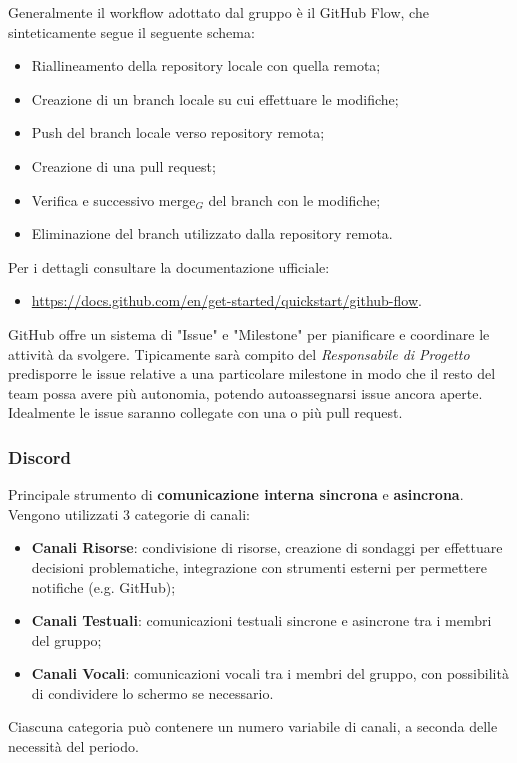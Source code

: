 Generalmente il workflow adottato dal gruppo è il GitHub Flow, che sinteticamente segue il seguente schema:
\begin{itemize}
  \item Riallineamento della repository locale con quella remota;
  \item Creazione di un branch locale su cui effettuare le modifiche;
  \item Push del branch locale verso repository remota;
  \item Creazione di una pull request;
  \item Verifica e successivo merge$_G$ del branch con le modifiche;
  \item Eliminazione del branch utilizzato dalla repository remota.
\end{itemize}
Per i dettagli consultare la documentazione ufficiale:
\begin{itemize}
  \item \url{https://docs.github.com/en/get-started/quickstart/github-flow}.
\end{itemize}

GitHub offre un sistema di "Issue" e "Milestone" per pianificare e coordinare le attività da svolgere. Tipicamente sarà compito del \textit{Responsabile di Progetto} predisporre le issue relative a una particolare milestone in modo che il resto del team possa avere più autonomia, potendo autoassegnarsi issue ancora aperte. Idealmente le issue saranno collegate con una o più pull request.

\subsubsection{Discord}
Principale strumento di \textbf{comunicazione interna sincrona} e \textbf{asincrona}. Vengono utilizzati 3 categorie di canali:
\begin{itemize}
  \item \textbf{Canali Risorse}: condivisione di risorse, creazione di sondaggi per effettuare decisioni problematiche, integrazione con strumenti esterni per permettere notifiche (e.g. GitHub);
  \item \textbf{Canali Testuali}: comunicazioni testuali sincrone e asincrone tra i membri del gruppo;
  \item \textbf{Canali Vocali}: comunicazioni vocali tra i membri del gruppo, con possibilità di condividere lo schermo se necessario.
\end{itemize}
Ciascuna categoria può contenere un numero variabile di canali, a seconda delle necessità del periodo.

